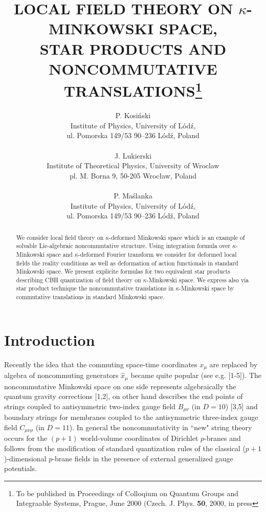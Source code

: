 \documentclass[a4paper,a4paper]{article}
\begin{document}
\title{LOCAL FIELD THEORY ON $\kappa$-MINKOWSKI SPACE, 
\\ 
STAR PRODUCTS AND NONCOMMUTATIVE 
TRANSLATIONS\footnote{To be published in Proceedings of 
Colloqium on
Quantum Groups and Integraable   Systems, Prague, June 2000 
(Czech. J. Phys. {\bf 50}, 2000, in press}}
\author{P. Kosi\'{n}ski
 \\ Institute of Physics, 
University of L\'{o}d\'{z}, \\
ul. Pomorska 149/53 90--236 L\'{o}d\'{z}, Poland \\ \\
J. Lukierski \\
Institute of Theoretical Physics, 
 University of Wroclaw \\ pl. M. Borna 9, 50-205 Wroc\l aw, Poland 
\\ \\
P. Ma\'{s}lanka \\
Institute of Physics, 
University of L\'{o}d\'{z}, \\
ul. Pomorska 149/53 90--236 L\'{o}d\'{z}, Poland }
\date{}
\maketitle

\begin{abstract}
We consider local field theory on $\kappa$-deformed Minkowski
space which is an example of solvable Lie-algebraic
noncommutative structure. Using integration formula over
$\kappa$-Minkowski space and $\kappa$-deformed Fourier 
transform
we consider for deformed local fields the reality conditions as
well as deformation of action functionals  in standard Minkowski
space. We present explicite formulas for two equivalent star
products describing CBH quantization of field theory on
$\kappa$-Minkowski space. We express also via star product
technique the noncommutative translations in $\kappa$-Minkowski
space by commutative translations in standard Minkowski space.
\end{abstract}

\section{Introduction}    

Recently the idea that the commuting space-time coordinates
${x}_{\mu}$ are replaced by algebra of noncommuting
generators $\hat{x}_{\mu}$ became quite popular (see e.g.
[1-5]). The noncommutative Minkowski space on one side 
represents 
algebraically the quantum gravity corrections [1,2], on other hand
describes the end points of strings coupled to antisymmetric
two-index gauge field $B_{\mu\nu}$ (in $D=10$) [3,5] and boundary
strings for membranes coupled to the antisymmetric three-index
gauge field $C_{\mu\nu\rho}$ (in $D=11$). In general the
noncommutativity in ``new" string theory occurs for the
$(p+1)$ world-volume 
 coordinates of Dirichlet $p$-branes and follows from the
modification of standard quantization rules of the classical
($p+1$)-dimensional $p$-brane fields in the presence of external
generalized gauge potentials.
\end{document}
